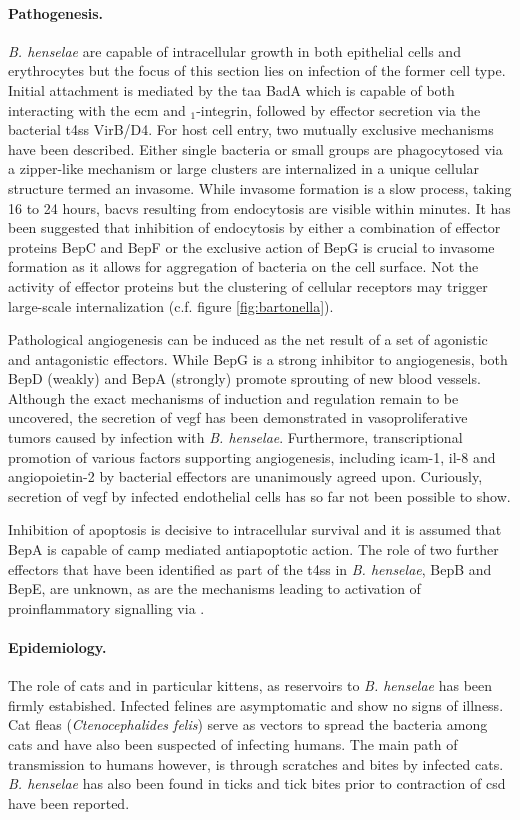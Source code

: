 \paragraph{Pathogenesis.}
\textit{B. henselae} are capable of intracellular growth in both epithelial cells and erythrocytes but the focus of this section lies on infection of the former cell type. Initial attachment is mediated by the \gls{taa} BadA which is capable of both interacting with the \gls{ecm} and \textbeta$_1$-integrin, followed by effector secretion via the bacterial \gls{t4ss} VirB\slash D4. For host cell entry, two mutually exclusive mechanisms have been described. Either single bacteria or small groups are phagocytosed via a zipper-like mechanism or large clusters are internalized in a unique cellular structure termed an invasome. While invasome formation is a slow process, taking 16 to 24 hours, \glspl{bacv} resulting from endocytosis are visible within minutes. It has been suggested that inhibition of endocytosis by either a combination of effector proteins BepC and BepF or the exclusive action of BepG is crucial to invasome formation as it allows for aggregation of bacteria on the cell surface. Not the activity of effector proteins but the clustering of cellular receptors may trigger large-scale internalization (c.f. figure \ref{fig:bartonella}).

Pathological angiogenesis can be induced as the net result of a set of agonistic and antagonistic effectors. While BepG is a strong inhibitor to angiogenesis, both BepD (weakly) and BepA (strongly) promote sprouting of new blood vessels. Although the exact mechanisms of induction and regulation remain to be uncovered, the secretion of \gls{vegf} has been demonstrated in vasoproliferative tumors caused by infection with \textit{B. henselae}. Furthermore, transcriptional promotion of various factors supporting angiogenesis, including \gls{icam-1}, \gls{il-8} and angiopoietin-2 by bacterial effectors are unanimously agreed upon. Curiously, secretion of \gls{vegf} by infected endothelial cells has so far not been possible to show.

Inhibition of apoptosis is decisive to intracellular survival and it is assumed that BepA is capable of \gls{camp} mediated antiapoptotic action. The role of two further effectors that have been identified as part of the \gls{t4ss} in \textit{B. henselae}, BepB and BepE, are unknown, as are the mechanisms leading to activation of proinflammatory signalling via .

\paragraph{Epidemiology.}
The role of cats and in particular kittens, as reservoirs to \textit{B. henselae} has been firmly estabished. Infected felines are asymptomatic and show no signs of illness. Cat fleas (\textit{Ctenocephalides felis}) serve as vectors to spread the bacteria among cats and have also been suspected of infecting humans. The main path of transmission to humans however, is through scratches and bites by infected cats. \textit{B. henselae} has also been found in ticks and tick bites prior to contraction of \gls{csd} have been reported.

